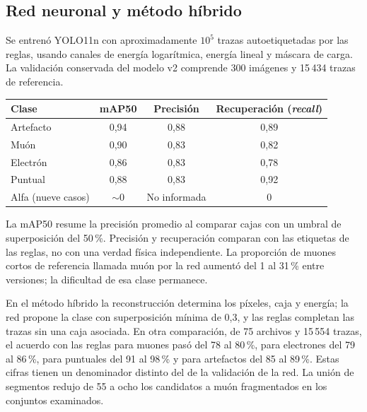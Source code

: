 \documentclass[10pt,a4paper]{article}
\begin{document}
\subsection{Red neuronal y método híbrido}
Se entrenó YOLO11n con aproximadamente $10^5$ trazas autoetiquetadas por las reglas, usando canales de energía logarítmica, energía lineal y máscara de carga. La validación conservada del modelo v2 comprende 300 imágenes y 15\,434 trazas de referencia.
\begin{center}\small
\begin{tabular}{@{}lccc@{}}\toprule
Clase & mAP50 & Precisión & Recuperación (\emph{recall}) \\\midrule
Artefacto & 0{,}94 & 0{,}88 & 0{,}89 \\
Muón & 0{,}90 & 0{,}83 & 0{,}82 \\
Electrón & 0{,}86 & 0{,}83 & 0{,}78 \\
Puntual & 0{,}88 & 0{,}83 & 0{,}92 \\
Alfa (nueve casos) & $\sim0$ & No informada & 0 \\\bottomrule
\end{tabular}\end{center}
La mAP50 resume la precisión promedio al comparar cajas con un umbral de superposición del 50\,\%. Precisión y recuperación comparan con las etiquetas de las reglas, no con una verdad física independiente. La proporción de muones cortos de referencia llamada muón por la red aumentó del 1 al 31\,\% entre versiones; la dificultad de esa clase permanece.

En el método híbrido la reconstrucción determina los píxeles, caja y energía; la red propone la clase con superposición mínima de 0{,}3, y las reglas completan las trazas sin una caja asociada. En otra comparación, de 75 archivos y 15\,554 trazas, el acuerdo con las reglas para muones pasó del 78 al 80\,\%, para electrones del 79 al 86\,\%, para puntuales del 91 al 98\,\% y para artefactos del 85 al 89\,\%. Estas cifras tienen un denominador distinto del de la validación de la red. La unión de segmentos redujo de 55 a ocho los candidatos a muón fragmentados en los conjuntos examinados.

\newpage
\end{document}
